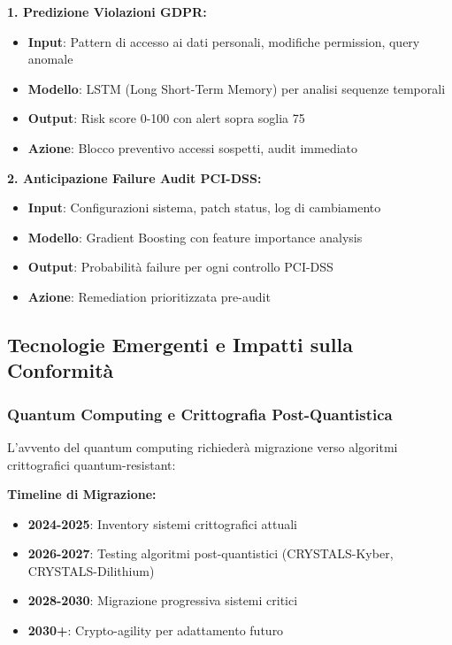 \textbf{1. Predizione Violazioni GDPR:}
\begin{itemize}
    \item \textbf{Input}: Pattern di accesso ai dati personali, modifiche permission, query anomale
    \item \textbf{Modello}: LSTM (Long Short-Term Memory) per analisi sequenze temporali
    \item \textbf{Output}: Risk score 0-100 con alert sopra soglia 75
    \item \textbf{Azione}: Blocco preventivo accessi sospetti, audit immediato
\end{itemize}

\textbf{2. Anticipazione Failure Audit PCI-DSS:}
\begin{itemize}
    \item \textbf{Input}: Configurazioni sistema, patch status, log di cambiamento
    \item \textbf{Modello}: Gradient Boosting con feature importance analysis
    \item \textbf{Output}: Probabilità failure per ogni controllo PCI-DSS
    \item \textbf{Azione}: Remediation prioritizzata pre-audit
\end{itemize}

\subsection{\texorpdfstring{Tecnologie Emergenti e Impatti sulla Conformità}{4.8.3 - Tecnologie Emergenti e Impatti sulla Conformità}}

\subsubsection{\texorpdfstring{Quantum Computing e Crittografia Post-Quantistica}{4.8.3.1 - Quantum Computing e Crittografia Post-Quantistica}}

L'avvento del quantum computing richiederà migrazione verso algoritmi crittografici quantum-resistant:

\textbf{Timeline di Migrazione:}
\begin{itemize}
    \item \textbf{2024-2025}: Inventory sistemi crittografici attuali
    \item \textbf{2026-2027}: Testing algoritmi post-quantistici (CRYSTALS-Kyber, CRYSTALS-Dilithium)
    \item \textbf{2028-2030}: Migrazione progressiva sistemi critici
    \item \textbf{2030+}: Crypto-agility per adattamento futuro
\end{itemize}

